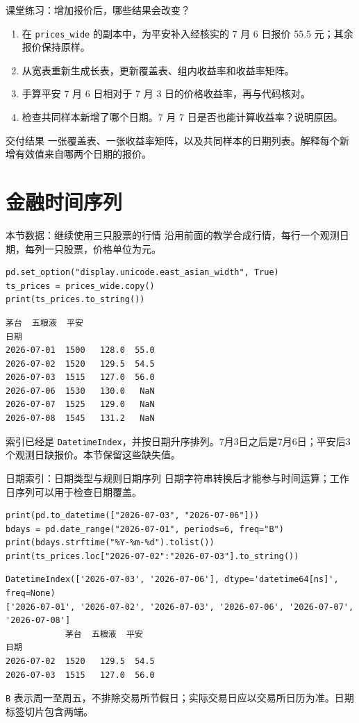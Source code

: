 \documentclass[9pt]{ctexbeamer}
\begin{document}
\begin{frame}{课堂练习：增加报价后，哪些结果会改变？}
\begin{enumerate}
\item 在 \texttt{prices\_wide} 的副本中，为平安补入经核实的 7 月 6 日报价 55.5 元；其余报价保持原样。
\item 从宽表重新生成长表，更新覆盖表、组内收益率和收益率矩阵。
\item 手算平安 7 月 6 日相对于 7 月 3 日的价格收益率，再与代码核对。
\item 检查共同样本新增了哪个日期。7 月 7 日是否也能计算收益率？说明原因。
\end{enumerate}
\begin{block}{交付结果}
一张覆盖表、一张收益率矩阵，以及共同样本的日期列表。解释每个新增有效值来自哪两个日期的报价。
\end{block}
\end{frame}
\section{金融时间序列}

\begin{frame}[fragile]{本节数据：继续使用三只股票的行情}
\small 沿用前面的教学合成行情，每行一个观测日期，每列一只股票，价格单位为元。
\medskip
\begin{lstlisting}
pd.set_option("display.unicode.east_asian_width", True)
ts_prices = prices_wide.copy()
print(ts_prices.to_string())
\end{lstlisting}
\begin{lstlisting}[language={},numbers=none,basicstyle=\ttfamily\scriptsize]
            茅台  五粮液  平安
日期
2026-07-01  1500   128.0  55.0
2026-07-02  1520   129.5  54.5
2026-07-03  1515   127.0  56.0
2026-07-06  1530   130.0   NaN
2026-07-07  1525   129.0   NaN
2026-07-08  1545   131.2   NaN
\end{lstlisting}
\small 索引已经是 \texttt{DatetimeIndex}，并按日期升序排列。7月3日之后是7月6日；平安后3个观测日缺报价。本节保留这些缺失值。
\end{frame}

\begin{frame}[fragile]{日期索引：日期类型与规则日期序列}
\small 日期字符串转换后才能参与时间运算；工作日序列可以用于检查日期覆盖。
\medskip
\begin{lstlisting}
print(pd.to_datetime(["2026-07-03", "2026-07-06"]))
bdays = pd.date_range("2026-07-01", periods=6, freq="B")
print(bdays.strftime("%Y-%m-%d").tolist())
print(ts_prices.loc["2026-07-02":"2026-07-03"].to_string())
\end{lstlisting}
\begin{lstlisting}[language={},numbers=none,basicstyle=\ttfamily\scriptsize]
DatetimeIndex(['2026-07-03', '2026-07-06'], dtype='datetime64[ns]', freq=None)
['2026-07-01', '2026-07-02', '2026-07-03', '2026-07-06', '2026-07-07', '2026-07-08']
            茅台  五粮液  平安
日期
2026-07-02  1520   129.5  54.5
2026-07-03  1515   127.0  56.0
\end{lstlisting}
\small \texttt{B} 表示周一至周五，不排除交易所节假日；实际交易日应以交易所日历为准。日期标签切片包含两端。
\end{frame}
\end{document}
